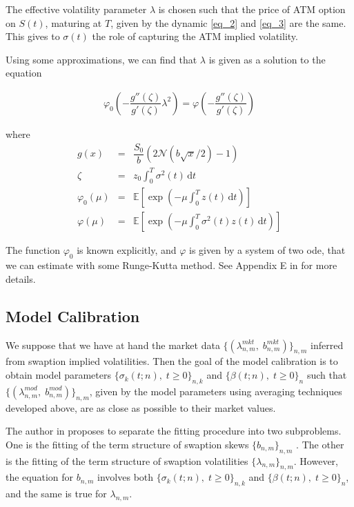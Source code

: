 \documentclass[12pt,a4paper]{article}
\def\E{{\mathbb E}}
\begin{document}
The effective volatility parameter $\lambda$ is chosen such that the price of ATM option on $S(t)$, maturing at $T$, given by the dynamic \ref{eq_2} and \ref{eq_3} are the same. This gives to $\sigma(t)$ the role of capturing the ATM implied volatility.

Using some approximations, we can find that $\lambda$ is given as a solution to the equation

\begin{eqnarray*}
\varphi_0 \left(-\dfrac{g''(\zeta)}{g'(\zeta)} \lambda^2\right) = \varphi\left(-\dfrac{g''(\zeta)}{g'(\zeta)}\right)
\end{eqnarray*}

where 
\begin{eqnarray*}
g(x) &=& \dfrac{S_0}{b} \left( 2 \mathcal{N}(b\sqrt{x}/2) - 1\right) \\
\zeta &=& z_0 \int_{0}^T  \sigma^2(t)\, \mathrm dt \\
\varphi_0(\mu) &=& \E\left[  \exp\left( -\mu \int_{0}^T z(t)\, \mathrm dt\right)   \right] \\
\varphi(\mu) &=& \E\left[  \exp\left( -\mu \int_{0}^T \sigma^2(t) z(t)\, \mathrm dt\right)   \right]
\end{eqnarray*}

The function $\varphi_0$ is known explicitly, and $\varphi$ is given by a system of two ode, that we can estimate with some Runge-Kutta method. See Appendix E in \cite{Pit04} for more details.


\subsection{Model Calibration}

We suppose that we have at hand the market data $\{(\lambda^{mkt}_{n,m}, \; b^{mkt}_{n,m})\}_{n,m}$ inferred from swaption implied volatilities. Then the goal of the model calibration is to obtain model parameters $\{ \sigma_k(t;n), \; t\geq0\}_{n,k}$ and $\{ \beta(t;n), \; t\geq0\}_{n}$ such that $\{(\lambda^{mod}_{n,m}, \; b^{mod}_{n,m})\}_{n,m}$, given by the model parameters using averaging techniques developed above, are as close as possible to their market values.

The author in \cite{Pit04} proposes to separate the fitting procedure into two subproblems. One is the fitting of the term
structure of swaption skews $\{b_{n,m}\}_{n,m}$ . The other is the fitting of the term structure of swaption volatilities $\{\lambda_{n,m}\}_{n,m}$. However, the equation for $b_{n,m}$ involves both $\{ \sigma_k(t;n), \; t\geq0\}_{n,k}$ and $\{ \beta(t;n), \; t\geq0\}_{n}$, and the same is true for $\lambda_{n,m}$.
\end{document}
